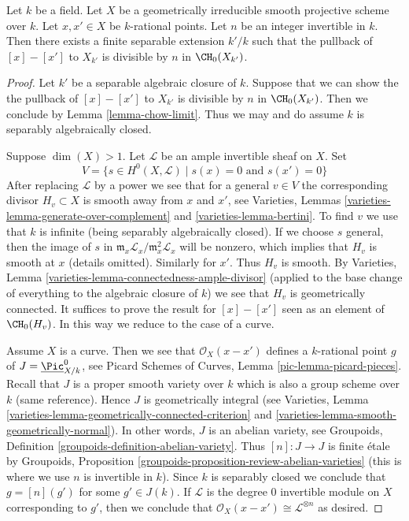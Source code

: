 \begin{lemma}
\label{lemma-divide-difference-points}
Let $k$ be a field. Let $X$ be a geometrically irreducible
smooth projective scheme over $k$. Let $x, x' \in X$ be $k$-rational points.
Let $n$ be an integer invertible in $k$.
Then there exists a finite separable extension $k'/k$ such that
the pullback of $[x] - [x']$ to $X_{k'}$
is divisible by $n$ in $\CH_0(X_{k'})$.
\end{lemma}

\begin{proof}
Let $k'$ be a separable algebraic closure of $k$. Suppose that we can show
the the pullback of $[x] - [x']$ to $X_{k'}$ is divisible by $n$ in
$\CH_0(X_{k'})$. Then we conclude by Lemma \ref{lemma-chow-limit}.
Thus we may and do assume $k$ is separably algebraically closed.

\medskip\noindent
Suppose $\dim(X) > 1$. Let $\mathcal{L}$ be an ample invertible sheaf on $X$.
Set
$$
V = \{s \in H^0(X, \mathcal{L}) \mid s(x) = 0\text{ and }s(x') = 0 \}
$$
After replacing $\mathcal{L}$ by a power we see that for
a general $v \in V$ the corresponding divisor $H_v \subset X$ is smooth
away from $x$ and $x'$, see
Varieties, Lemmas \ref{varieties-lemma-generate-over-complement} and
\ref{varieties-lemma-bertini}. To find $v$ we use that $k$ is infinite (being
separably algebraically closed).
If we choose $s$ general, then the image of $s$ in
$\mathfrak m_x\mathcal{L}_x/\mathfrak m_x^2\mathcal{L}_x$
will be nonzero, which implies that $H_v$ is smooth at $x$
(details omitted). Similarly for $x'$. Thus $H_v$ is smooth.
By Varieties, Lemma \ref{varieties-lemma-connectedness-ample-divisor}
(applied to the base change of everything
to the algebraic closure of $k$)
we see that $H_v$ is geometrically connected.
It suffices to prove the result for
$[x] - [x']$ seen as an element of $\CH_0(H_v)$.
In this way we reduce to the case of a curve.

\medskip\noindent
Assume $X$ is a curve. Then we see that $\mathcal{O}_X(x - x')$
defines a $k$-rational point $g$ of $J = \underline{\Pic}^0_{X/k}$, see
Picard Schemes of Curves, Lemma \ref{pic-lemma-picard-pieces}.
Recall that $J$ is a proper smooth variety over $k$
which is also a group scheme over $k$ (same reference).
Hence $J$ is geometrically integral
(see Varieties, Lemma \ref{varieties-lemma-geometrically-connected-criterion}
and \ref{varieties-lemma-smooth-geometrically-normal}).
In other words, $J$ is an abelian variety, see
Groupoids, Definition \ref{groupoids-definition-abelian-variety}.
Thus $[n] : J \to J$ is finite \'etale by
Groupoids, Proposition \ref{groupoids-proposition-review-abelian-varieties}
(this is where we use $n$ is invertible in $k$).
Since $k$ is separably closed we conclude that $g = [n](g')$
for some $g' \in J(k)$. If $\mathcal{L}$ is the degree $0$
invertible module on $X$ corresponding to $g'$, then we conclude
that $\mathcal{O}_X(x - x') \cong \mathcal{L}^{\otimes n}$ as desired.
\end{proof}

